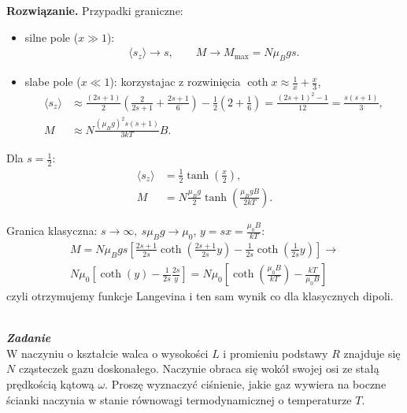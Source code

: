 \documentclass[11pt,a4paper]{article}
\newcounter{zadanie}\newcommand{\zadanie}[1][]{\addtocounter{zadanie}{1} ~\\  {\bf \emph{Zadanie \arabic{zadanie} #1 }} \\}
\newenvironment{solution}{\vspace{1cm} \par\textbf{Rozwiązanie.} \vspace{1cm}}{}
\begin{document}
\begin{solution}
Przypadki graniczne:
\begin{itemize}
  \item silne pole ($x\gg 1$):
  \begin{align*}
    \langle s_z \rangle \to s,\qquad M \to M_{\max}=N\mu_B g s.
  \end{align*}
  \item slabe pole ($x\ll 1$): korzystajac z rozwinięcia $\coth x \approx \frac{1}{x}+\frac{x}{3}$,
  \begin{align*}
    \langle s_z \rangle &\approx \frac{(2s+1)}{2} \left(\frac{2}{2s+1}+\frac{2s+1}{6}\right) - 
    \frac{1}{2} \left(2+\frac{1}{6}\right) = \frac{(2s+1)^2-1}{12} = \frac{s(s+1)}{3},\\
    M &\approx N\frac{(\mu_B g)^2 s(s+1)}{3kT}B.
  \end{align*}
\end{itemize}

Dla $s=\frac{1}{2}$:
\begin{align*}
  \langle s_z \rangle &= \frac{1}{2}\tanh\!\left(\frac{x}{2}\right),\\
  M &= N\frac{\mu_B g}{2}\tanh\!\left(\frac{\mu_B g B}{2kT}\right).
\end{align*}

Granica klasyczna: $s\to\infty,~s\mu_B g \to \mu_{0}$, $y = sx = \frac{\mu_{0} B}{kT}$:
\begin{align*}
  M =  N\mu_B g s \left[\frac{2s+1}{2s}\coth\!\left(\frac{2s+1}{2s}y\right)-\frac{1}{2s}\coth\!\left(\frac{1}{2s}y\right) \right] \to \\
  N\mu_{0}\left[\coth\!\left(y\right)- \frac{1}{2s}\frac{2s}{y} \right] = 
  N\mu_{0}\left[\coth\!\left(\frac{\mu_{0} B}{kT}\right)- \frac{kT}{\mu_{0} B} \right]
\end{align*}
czyli otrzymujemy funkcje Langevina i ten sam wynik co dla klasycznych dipoli.



\newpage   
\end{solution}
\zadanie[]

W naczyniu o kształcie walca o wysokości $L$ i promieniu podstawy $R$ znajduje się 
$N$ cząsteczek gazu doskonałego. Naczynie obraca się wokół swojej osi ze stałą 
prędkością kątową $\omega$. Proszę wyznaczyć ciśnienie, jakie gaz wywiera na boczne ścianki 
naczynia w stanie równowagi termodynamicznej o temperaturze $T$.
\end{document}
